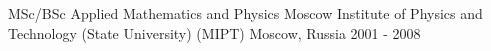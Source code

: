 
\begin{cventries}

  \cvblitz
    {MSc/BSc} %
    {Applied Mathematics and Physics}
    {Moscow Institute of Physics and Technology (State University) (MIPT)} %
    {Moscow, Russia} %
    {2001 - 2008} %

\end{cventries}
